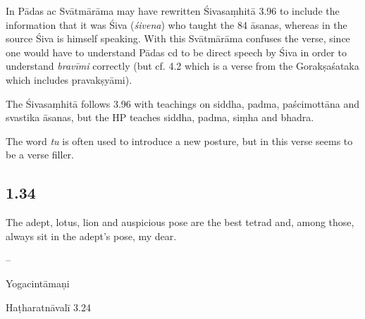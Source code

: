 \begin{ekdosis}
\begin{testimonia}[hp01_033]
\end{testimonia}

\begin{philcomm}[hp01_033]
In Pādas ac Svātmārāma may have rewritten Śivasaṃhitā 3.96 to include the information that it was Śiva (\emph{śivena}) who taught the 84 āsanas, whereas in the source Śiva is himself speaking. With this
Svātmārāma confuses the verse, since one would have to understand Pādas cd to be direct speech by Śiva in order to understand \emph{bravīmi} correctly (but cf. 4.2 which is a verse from the Gorakṣaśataka which includes pravakṣyāmi).

The Śivasaṃhitā follows 3.96 with teachings on siddha, padma, paścimottāna and svastika āsanas, but the HP teaches siddha, padma, siṃha and bhadra.

The word \emph{tu} is often used to introduce a new posture, but in this verse seems to be a verse filler.
\end{philcomm}

\subsection*{1.34}
\begin{translation}[hp01_034]
The adept, lotus, lion and auspicious pose are the best tetrad and, among those, always sit in the adept’s pose, my dear.
\end{translation}

\begin{sources}[hp01_034]
--
\end{sources}

\begin{testimonia}[hp01_034]
Yogacintāmaṇi

\begin{versinnote}
\end{versinnote}

Haṭharatnāvalī 3.24

\begin{versinnote}
\end{versinnote}

\end{testimonia}


\end{ekdosis}
